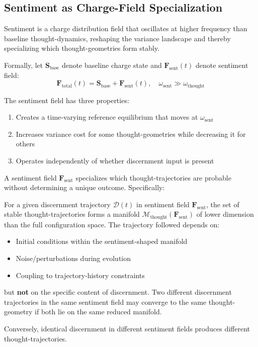\subsection{Sentiment as Charge-Field Specialization}

\begin{definition}
\label{def:sentiment}
Sentiment is a charge distribution field that oscillates at higher frequency than baseline thought-dynamics, reshaping the variance landscape and thereby specializing which thought-geometries form stably.

Formally, let $\mathbf{S}_{\text{base}}$ denote baseline charge state and $\mathbf{F}_{\text{sent}}(t)$ denote sentiment field:
$$\mathbf{F}_{\text{total}}(t) = \mathbf{S}_{\text{base}} + \mathbf{F}_{\text{sent}}(t), \quad \omega_{\text{sent}} \gg \omega_{\text{thought}}$$

The sentiment field has three properties:
\begin{enumerate}[label=(\arabic*),leftmargin=*]
\item Creates a time-varying reference equilibrium that moves at $\omega_{\text{sent}}$
\item Increases variance cost for some thought-geometries while decreasing it for others
\item Operates independently of whether discernment input is present
\end{enumerate}
\end{definition}

\begin{theorem}
\label{thm:sentiment-specialization}
A sentiment field $\mathbf{F}_{\text{sent}}$ specializes which thought-trajectories are probable without determining a unique outcome. Specifically:

For a given discernment trajectory $\mathcal{D}(t)$ in sentiment field $\mathbf{F}_{\text{sent}}$, the set of stable thought-trajectories forms a manifold $\mathcal{M}_{\text{thought}}(\mathbf{F}_{\text{sent}})$ of lower dimension than the full configuration space. The trajectory followed depends on:

\begin{itemize}
\item Initial conditions within the sentiment-shaped manifold
\item Noise/perturbations during evolution
\item Coupling to trajectory-history constraints
\end{itemize}

but \textbf{not} on the specific content of discernment. Two different discernment trajectories in the same sentiment field may converge to the same thought-geometry if both lie on the same reduced manifold.

Conversely, identical discernment in different sentiment fields produces different thought-trajectories.
\end{theorem}

